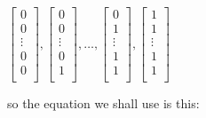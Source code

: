 $		\begin{bmatrix} 0\\ 0\\ \vdots \\ 0\\ 0\\ \end{bmatrix} , 
		\begin{bmatrix} 0\\ 0\\ \vdots \\ 0\\ 1\\ \end{bmatrix} , 
		\dots , 
		\begin{bmatrix} 0\\ 1\\ \vdots \\ 1\\ 1\\ \end{bmatrix} , 
		\begin{bmatrix} 1\\ 1\\ \vdots \\ 1\\ 1\\ \end{bmatrix}
$		
		
		so the equation we shall use is this:
		

